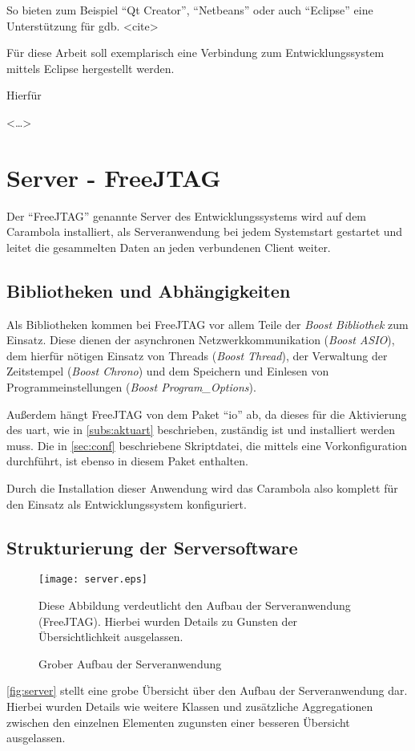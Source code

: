 So bieten zum Beispiel "`Qt Creator"', "`Netbeans"' oder auch "`Eclipse"' eine
Unterstützung für \gls{gdb}. <cite>

Für diese Arbeit soll exemplarisch eine Verbindung zum Entwicklungssystem
mittels Eclipse hergestellt werden.

Hierfür

<\ldots>
\section{Server - FreeJTAG}
Der "`FreeJTAG"' genannte Server des Entwicklungssystems wird auf dem Carambola
installiert, als Serveranwendung bei jedem Systemstart gestartet und leitet die
gesammelten Daten an jeden verbundenen Client weiter.


\subsection{Bibliotheken und Abhängigkeiten}
Als Bibliotheken kommen bei FreeJTAG vor allem Teile der \emph{Boost Bibliothek}
zum Einsatz. Diese dienen der asynchronen Netzwerkkommunikation (\emph{Boost
ASIO}), dem hierfür nötigen Einsatz von Threads (\emph{Boost Thread}), der
Verwaltung der Zeitstempel (\emph{Boost Chrono}) und dem Speichern und
Einlesen von Programmeinstellungen (\emph{Boost Program\_Options}).

Außerdem hängt FreeJTAG von dem Paket "`io"' ab, da dieses für die Aktivierung
des \gls{uart}, wie in \autoref{subs:aktuart} beschrieben, zuständig ist und
installiert werden muss. Die in \autoref{sec:conf} beschriebene Skriptdatei,
die mittels  eine Vorkonfiguration durchführt, ist
ebenso in diesem Paket enthalten.

Durch die Installation dieser Anwendung wird das Carambola also komplett für den
Einsatz als Entwicklungssystem konfiguriert.

\subsection{Strukturierung der Serversoftware}
\begin{figure}[!ht]
\centering
\texttt{[image: server.eps]}
\caption{Grober Aufbau der Serveranwendung}{Diese Abbildung verdeutlicht den
Aufbau der Serveranwendung (FreeJTAG). Hierbei wurden Details zu Gunsten der
Übersichtlichkeit ausgelassen.}
\label{fig:server}
\end{figure}
\autoref{fig:server} stellt eine grobe Übersicht über den Aufbau der
Serveranwendung dar. Hierbei wurden Details wie weitere Klassen und
zusätzliche Aggregationen zwischen den einzelnen Elementen zugunsten einer
besseren Übersicht ausgelassen.

